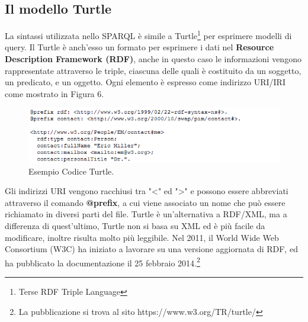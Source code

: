 \documentclass[a4paper,11pt]{article}
\begin{document}
\subsection{Il modello Turtle}
\label{sec:2.1}
La sintassi utilizzata nello SPARQL è simile a Turtle\footnote{Terse RDF Triple Language} per esprimere modelli di query. \newline 
Il Turtle è anch'esso un formato per esprimere i dati nel \textbf{Resource Description Framework (RDF)},  anche in questo caso le informazioni vengono rappresentate attraverso le triple, ciascuna delle quali è costituito da un soggetto, un predicato, e un oggetto. Ogni elemento è espresso come indirizzo URI/IRI come mostrato in Figura 6.
\begin{figure}[htbp]
	\centering
	\includegraphics[scale=1]{turtle.png}
	\caption{Esempio Codice Turtle.}
	\label{fig:2}
\end{figure}
Gli indirizzi URI vengono racchiusi tra "<" ed ">" e possono essere abbreviati attraverso il comando \textbf{@prefix}, a cui viene associato un nome che può essere richiamato in diversi parti del file.\newline
Turtle è un'alternativa a RDF/XML, ma a differenza di quest'ultimo, Turtle non si basa su XML ed è più facile da modificare, inoltre risulta molto più leggibile.\newline
Nel 2011, il World Wide Web Consortium (W3C) ha iniziato a lavorare su una versione aggiornata di RDF, ed ha pubblicato la documentazione il 25 febbraio 2014.\footnote{La pubblicazione si trova al sito https://www.w3.org/TR/turtle/}
\end{document}
